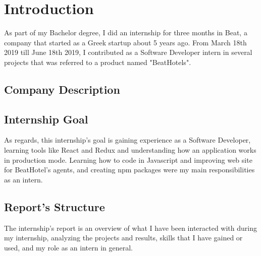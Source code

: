 
\chapter{Introduction} %
\label{Chapter1}
As part of my Bachelor degree, I did an internship for three months in Beat, a company that started as a Greek startup about 5 years ago. From March 18th 2019 till June 18th 2019, I contributed as a Software Developer intern in several projects that was referred to a product named "BeatHotels".

\section{Company Description}

\section{Internship Goal}
 As regards, this internship's goal is gaining experience as a Software Developer, learning tools like React and Redux and understanding how an application works in production mode. Learning how to code in Javascript and improving web site for BeatHotel's agents, and creating npm packages were my main responsibilities as an intern.
 
\section{Report's Structure}
The internship's report is an overview of what I have been interacted with during my internship, analyzing the projects and results, skills that I have gained or used, and my role as an intern in general.

